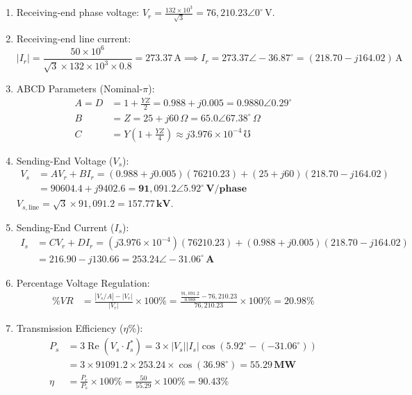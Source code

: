 \documentclass[11pt,a4paper]{article}
\newenvironment{Solution}[1][Step-by-Step Solution]{\begin{tcolorbox}[solbox, title=#1]}{\end{tcolorbox}}
\begin{document}
\begin{Solution}
\begin{enumerate}
  \item Receiving-end phase voltage: $V_r = \frac{132 \times 10^3}{\sqrt{3}} = 76,210.23 \angle 0^\circ\,\text{V}$.
  \item Receiving-end line current:
    \begin{equation*}
      |I_r| = \frac{50 \times 10^6}{\sqrt{3} \times 132 \times 10^3 \times 0.8} = 273.37\,\text{A} \implies I_r = 273.37 \angle -36.87^\circ = (218.70 - j 164.02)\,\text{A}
    \end{equation*}
  \item ABCD Parameters (Nominal-$\pi$):
    \begin{align*}
      A = D &= 1 + \frac{YZ}{2} = 0.988 + j 0.005 = 0.9880 \angle 0.29^\circ \\
      B &= Z = 25 + j 60\,\Omega = 65.0 \angle 67.38^\circ\,\Omega \\
      C &= Y \left(1 + \frac{YZ}{4}\right) \approx j 3.976 \times 10^{-4}\,\mho
    \end{align*}
  \item Sending-End Voltage ($V_s$):
    \begin{align*}
      V_s &= A V_r + B I_r = (0.988 + j0.005)(76210.23) + (25 + j60)(218.70 - j164.02) \\
          &= 90604.4 + j 9402.6 = \mathbf{91,091.2 \angle 5.92^\circ\,\text{V/phase}}
    \end{align*}
    $V_{s,\text{line}} = \sqrt{3} \times 91,091.2 = \mathbf{157.77\,\text{kV}}$.
  \item Sending-End Current ($I_s$):
    \begin{align*}
      I_s &= C V_r + D I_r = (j 3.976 \times 10^{-4})(76210.23) + (0.988 + j0.005)(218.70 - j164.02) \\
          &= 216.90 - j 130.66 = \mathbf{253.24 \angle -31.06^\circ\,\text{A}}
    \end{align*}
  \item Percentage Voltage Regulation:
    \begin{align*}
      \% VR &= \frac{|V_s / A| - |V_r|}{|V_r|} \times 100\% = \frac{\frac{91,091.2}{0.988} - 76,210.23}{76,210.23} \times 100\% = \mathbf{20.98\%}
    \end{align*}
  \item Transmission Efficiency ($\eta\%$):
    \begin{align*}
      P_s &= 3 \operatorname{Re}(V_s \cdot I_s^*) = 3 \times |V_s| |I_s| \cos(5.92^\circ - (-31.06^\circ)) \\
          &= 3 \times 91091.2 \times 253.24 \times \cos(36.98^\circ) = \mathbf{55.29\,\text{MW}} \\
      \eta &= \frac{P_r}{P_s} \times 100\% = \frac{50}{55.29} \times 100\% = \mathbf{90.43\%}
    \end{align*}
\end{enumerate}
\end{Solution}
\end{document}
